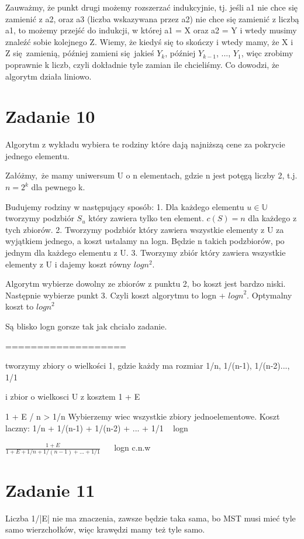 \documentclass[12pt]{article}
\begin{document}
Zauważmy, że punkt drugi możemy rozszerzać indukcyjnie, tj. jeśli a1 nie chce się zamienić z a2, oraz a3 (liczba wskazywana przez a2) nie chce się zamienić z liczbą a1, to możemy przejść do indukcji, w której a1 = X oraz a2 = Y i wtedy musimy znaleźć sobie kolejnego Z. Wiemy, że kiedyś się to skończy i wtedy mamy, że X i Z się zamienią, później zamieni się jakieś $Y_k$, później $Y_{k-1}$, ..., $Y_1$, więc zrobimy poprawnie k liczb, czyli dokładnie tyle zamian ile chcieliśmy. 
Co dowodzi, że algorytm działa liniowo.



\section{Zadanie 10}
Algorytm z wykładu wybiera te rodziny które dają najniższą cene za pokrycie jednego elementu.

Załóżmy, że mamy uniwersum U o n elementach, gdzie n jest potęgą liczby 2, t.j. $n = 2^k$ dla pewnego k.

Budujemy rodziny w następujący sposób:
1. Dla każdego elementu $u \in \mathbb{U}$ tworzymy podzbiór $S_u$ który zawiera tylko ten element. $c(S) = n$ dla każdego z tych zbiorów.
2. Tworzymy podzbiór który zawiera wszystkie elementy z U za wyjątkiem jednego, a koszt ustalamy na logn. Będzie n takich podzbiorów, po jednym dla każdego elementu z U.
3. Tworzymy zbiór który zawiera wszystkie elementy z U i dajemy koszt równy $logn^2$. 

Algorytm wybierze dowolny ze zbiorów z punktu 2, bo koszt jest bardzo niski. Następnie wybierze punkt 3.
Czyli koszt algorytmu to logn + ${logn}^2$.
Optymalny koszt to ${logn}^2$

Są blisko logn gorsze tak jak chciało zadanie.




===================


tworzymy zbiory o wielkości 1, gdzie każdy ma rozmiar 1/n, 1/(n-1), 1/(n-2)..., 1/1 

i zbior o wielkosci U z kosztem 1 + E 

1 + E / n > 1/n 
Wybierzemy wiec wszystkie zbiory jednoelementowe. Koszt laczny:
1/n + 1/(n-1) + 1/(n-2) + ... + 1/1 ~ logn 


$\frac{1+E}{1 + E + 1/n + 1/(n-1) + ... + 1/1}$ ~~ logn c.n.w



\section{Zadanie 11}
Liczba 1/|E| nie ma znaczenia, zawsze będzie taka sama, bo MST musi mieć tyle samo wierzchołków, więc krawędzi mamy też tyle samo. 
\end{document}
